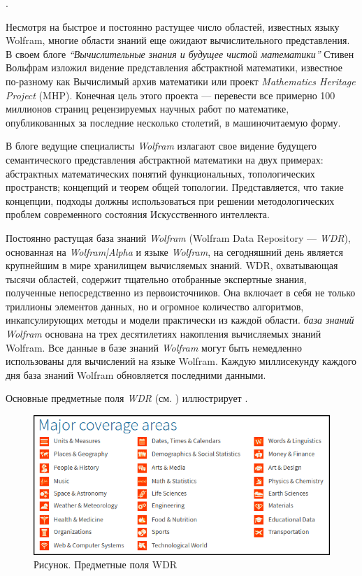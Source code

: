 . 

Несмотря на быстрое и постоянно растущее число областей, известных языку Wolfram, многие области знаний еще ожидают вычислительного представления. В своем блоге \textit{``Вычислительные знания и будущее чистой математики''} Стивен Вольфрам изложил видение представления абстрактной математики, известное по-разному как Вычислимый архив математики или проект \textit{Mathematics Heritage Project} (MHP). Конечная цель этого проекта --- перевести все примерно 100 миллионов страниц рецензируемых научных работ по математике, опубликованных за последние несколько столетий, в машиночитаемую форму.


В блоге  ведущие специалисты \textit{Wolfram} излагают свое видение будущего семантического представления абстрактной математики на двух примерах: абстрактных математических понятий функциональных, топологических пространств; концепций и теорем общей топологии. 
Представляется, что такие концепции, подходы должны использоваться при решении методологических проблем современного состояния Искусственного интеллекта. 


Постоянно растущая база знаний \textit{Wolfram} (Wolfram
Data Repository --- \textit{WDR}), основанная на \textit{Wolfram|Alpha} и языке \textit{Wolfram}, на сегодняшний день является крупнейшим в мире хранилищем вычисляемых знаний. 
WDR, охватывающая тысячи областей, содержит тщательно отобранные экспертные знания, полученные непосредственно из первоисточников. 
Она включает в себя не только триллионы элементов данных, но и огромное количество алгоритмов, инкапсулирующих методы и модели практически из каждой области.
\textit{база знаний} \textit{Wolfram} основана на трех десятилетиях накопления вычисляемых знаний Wolfram. Все данные в базе знаний \textit{Wolfram} могут быть немедленно использованы для вычислений на языке Wolfram. Каждую миллисекунду каждого дня база знаний Wolfram обновляется последними данными. 

Основные предметные поля \textit{WDR} (см. ) иллюстрирует \textit{}.

\begin{figure}[H]
	\includegraphics[scale=0.9]{images/part7/chapter_integration/integr_alg1.png}
	\caption{Рисунок. Предметные поля WDR}
	\label{fig:integr_alg1}
\end{figure}


